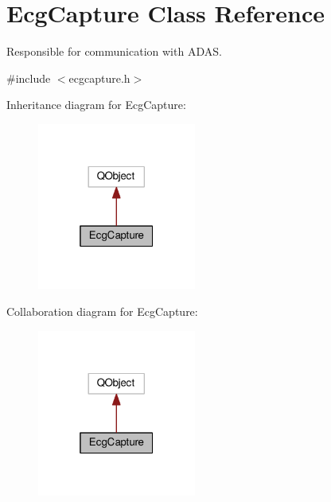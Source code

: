 \hypertarget{classEcgCapture}{}\section{Ecg\+Capture Class Reference}
\label{classEcgCapture}


Responsible for communication with A\+D\+AS.  




{\ttfamily \#include $<$ecgcapture.\+h$>$}



Inheritance diagram for Ecg\+Capture\+:
\nopagebreak
\begin{figure}[H]
\begin{center}
\leavevmode
\includegraphics[width=148pt]{classEcgCapture__inherit__graph}
\end{center}
\end{figure}


Collaboration diagram for Ecg\+Capture\+:
\nopagebreak
\begin{figure}[H]
\begin{center}
\leavevmode
\includegraphics[width=148pt]{classEcgCapture__coll__graph}
\end{center}
\end{figure}
